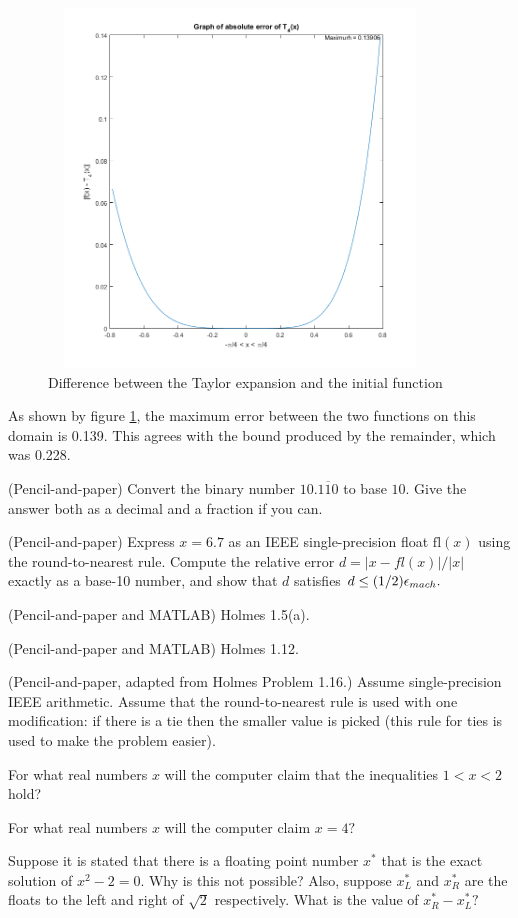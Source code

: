 \begin{figure}[!h]
	\centering
	\includegraphics[width=4in, height=3.75in]{abs_error.PNG}
	\caption{Difference between the Taylor expansion and the initial function}
	\label{fig:graph2}
\end{figure}

As shown by figure \ref{fig:graph2}, the maximum error between the two functions on this domain is 0.139.
This agrees with the bound produced by the remainder, which was 0.228.
\eenum

\newpage

\item (Pencil-and-paper)
Convert the binary number $10.\overline{110}$ to base $10.$  Give the answer both as a decimal and a fraction if you can.

\item (Pencil-and-paper)
Express $x=6.7$ as an IEEE single-precision float $\text{fl}(x)$ using the round-to-nearest rule.  Compute the relative error $d=|x-fl(x)|/|x|$ exactly as a base-10 number, and show that $d$ satisfies $d \le (1/2)\epsilon_{mach}.$


\item (Pencil-and-paper and MATLAB)
Holmes 1.5(a).

\item (Pencil-and-paper and MATLAB)
Holmes 1.12.

\item
(Pencil-and-paper, adapted from Holmes Problem 1.16.)  Assume single-precision IEEE arithmetic. Assume that the round-to-nearest rule is used with one modification: if there is a tie then the smaller value is picked (this rule for ties is used to make the problem easier).
\benum
\item For what real numbers $x$ will the computer claim that the inequalities $1 < x < 2$ hold?
\item For what real numbers $x$ will the computer claim $x = 4?$
\item Suppose it is stated that there is a floating point number $x^*$ that is the exact solution of
$x^2-2=0.$   Why is this not possible? Also, suppose $x^*_L$ and $x^*_R$ are the floats to the left and right of $\sqrt 2$ respectively.  What is the value of $x^*_R-x^*_L?$
\eenum

